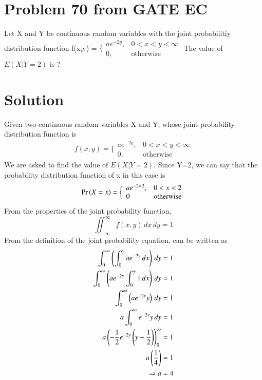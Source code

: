 \documentclass[journal,12pt,twocolumn]{IEEEtran}
\begin{document}
\section{\textbf{Problem 70 from GATE EC}}
Let X and Y be continuous random variables with the joint probabilitiy distribution function\newline
f(x,y) = $\bigg\{ \begin{array}{lr}
    ae^{-2y}, & 0<x<y<\infty  \\
     0, &\text{otherwise} 
\end{array}$\newline
The value of $E(X|Y=2)$ is ?
\section{\textbf{Solution}}
Given two continuous random variables X and Y, whose joint probability distribution function is\newline
\begin{equation}
    f(x,y) = \bigg\{ \begin{array}{lr}
    ae^{-2y}, & 0<x<y<\infty  \\
     0, &\text{otherwise} 
\end{array}
\end{equation}
We are asked to find the value of $E(X|Y=2)$. Since Y=2, we can say that the probability distribution function of x in this case is
\begin{equation}
    \Pr\left(X=x\right) = \bigg\{ \begin{array}{lr}
         ae^{-2\times 2}, &0<x<2  \\
         0 & \text{otherwise} 
    \end{array}
\end{equation}
From the properties of the joint probability function,
\begin{equation}
    \iint_{-\infty}^{\infty}f(x,y) \,dx\,dy = 1
\end{equation}
From the definition of the joint probability equation,  can be written as
\begin{align}
    \int_0^{\infty}\left(\int_0^y ae^{-2y} \,dx\right) \,dy &= 1 \\
    \int_0^{\infty}\left(ae^{-2y}\int_0^y 1 \,dx\right) \,dy &=1 \\
    \int_0^{\infty}\left(ae^{-2y}y\right) \,dy &= 1 \\
    a\int_0^{\infty} e^{-2y}y \,dy &= 1 \\
    a\left(-\frac{1}{2}e^{-2y}\left(y+\frac{1}{2}\right)\right)_0^{\infty} &= 1 \\
    a \left(\frac{1}{4}\right) &= 1 \\
    \Rightarrow a &= 4
\end{align}
\end{document}
